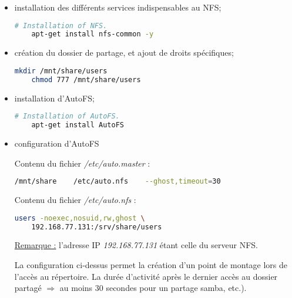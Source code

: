 \begin{itemize}
\item installation des différents services indispensables au NFS;

  \begin{lstlisting}[language=bash]
    # Installation of NFS.
    apt-get install nfs-common -y
  \end{lstlisting}

    \item création du dossier de partage, et ajout de droits
      spécifiques;

  \begin{lstlisting}[language=bash]
    mkdir /mnt/share/users
    chmod 777 /mnt/share/users
  \end{lstlisting}

\item installation d'AutoFS;

  \begin{lstlisting}[language=bash]
    # Installation of AutoFS.
    apt-get install AutoFS
  \end{lstlisting}

\item configuration d'AutoFS

  Contenu du fichier \textit{/etc/auto.master} :

  \begin{lstlisting}[language=bash]
    /mnt/share    /etc/auto.nfs    --ghost,timeout=30
  \end{lstlisting}

  Contenu du fichier \textit{/etc/auto.nfs} :

  \begin{lstlisting}[language=bash]
    users -noexec,nosuid,rw,ghost \
    192.168.77.131:/srv/share/users
  \end{lstlisting}

  \underline{Remarque :} l'adresse IP \emph{192.168.77.131} étant celle du serveur NFS.

  La configuration ci-dessus permet la création d'un point de montage lors de
  l'accès au répertoire. La durée d'activité après le dernier accès au dossier
  partagé $\Rightarrow$ au moins 30 secondes pour un partage samba, etc.).
\end{itemize}


